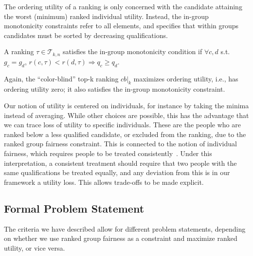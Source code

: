 \noindent The ordering utility of a ranking is only concerned with the candidate attaining the worst (minimum) ranked individual utility. Instead, the in-group monotonicity constraints refer to all elements, and specifies that within groups candidates must be sorted by decreasing qualifications.

\begin{definition}
	\label{def:inGroupMonotonicity}
	A ranking $\tau \in {\mathcal T}_{k,n}$ satisfies the in-group monotonicity condition if $\forall c,d$ s.t. $g_c = g_d$, $r(c,\tau) < r(d,\tau) \Rightarrow q_c \ge q_d$.
\end{definition}

\noindent Again, the ``color-blind'' top-k ranking $\textit{cb}|_k$ maximizes ordering utility, i.e., has ordering utility zero; it also satisfies the in-group monotonicity constraint.

\label{concept:our-utility-individual-fairness}
%
Our notion of utility is centered on individuals, for instance by taking the minima instead of averaging.
%
While other choices are possible, this has the advantage that we can trace loss of utility to specific individuals. These are the people who are ranked below a less qualified candidate, or excluded from the ranking, due to the ranked group fairness constraint.
%
This is connected to the notion of individual fairness, which requires people to be treated consistently~\cite{Dwork2012}. Under this interpretation, a consistent treatment should require that two people with the same qualifications be treated equally, and any deviation from this is in our framework a utility loss. This allows trade-offs to be made explicit.

\subsection{Formal Problem Statement}
\label{subsec:problem-statement}
The criteria we have described allow for different problem statements, depending on whether we use ranked group fairness as a constraint and maximize ranked utility, or vice versa.

